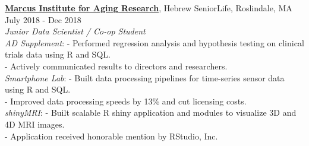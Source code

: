 \documentclass[a4paper]{article}
\newcommand{\mybullet}{
	\indent 
  \textbullet \hspace*{2mm}
}
\begin{document}

  \noindent
  \textbf{\href{https://www.marcusinstituteforaging.org/}{Marcus Institute for Aging Research}}, 
  Hebrew SeniorLife, Roslindale, MA 
  \hfill July 2018 - Dec 2018 \\
        \textit{Junior Data Scientist / Co-op Student} \\
        \mybullet \textit{AD Supplement}: 
        \hspace*{3.7 mm} - Performed regression analysis and hypothesis testing
        on clinical trials data using R and SQL. \\
        \hspace*{37.5 mm} - Actively communicated results to directors and researchers.  \\
        \mybullet \textit{Smartphone Lab}: 
        \hspace* {2.3 mm} - Built data processing pipelines for time-series sensor data using R and SQL. \\
        \hspace*{37.5 mm} - Improved data processing speeds by 13\% and cut licensing costs. \\ 
        \mybullet \textit{shinyMRI}: 
        \hspace* {12.7 mm} - Built scalable R shiny application and modules to visualize 3D and 4D MRI images. \\
        \hspace*{37.5 mm} - Application received honorable mention by RStudio, Inc. \\
        
	
\end{document}
